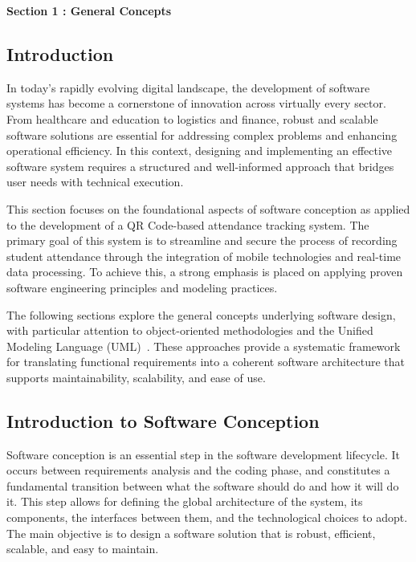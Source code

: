 \documentclass[12pt,a4paper]{report}
\begin{document}
\newpage
\vspace{0.3cm}

\begin{tcolorbox}[
    colback=mintgreen!20, 
    colframe=mintgreen!80!black, 
    width=\textwidth, 
    boxrule=1pt, 
    arc=5pt, 
    auto outer arc,
    left=10pt,
    right=10pt,
    top=6pt,
    bottom=6pt
]
    \centering
    \Large \textbf{Section 1 : General Concepts}
\end{tcolorbox}

{}

\subsection{Introduction}
In today's rapidly evolving digital landscape, the development of software systems has become a cornerstone of innovation across virtually every sector. From healthcare and education to logistics and finance, robust and scalable software solutions are essential for addressing complex problems and enhancing operational efficiency. In this context, designing and implementing an effective software system requires a structured and well-informed approach that bridges user needs with technical execution.

This section focuses on the foundational aspects of software conception as applied to the development of a QR Code-based attendance tracking system. The primary goal of this system is to streamline and secure the process of recording student attendance through the integration of mobile technologies and real-time data processing. To achieve this, a strong emphasis is placed on applying proven software engineering principles and modeling practices.

The following sections explore the general concepts underlying software design, with particular attention to object-oriented methodologies and the Unified Modeling Language (UML)~\cite{omg2017}. These approaches provide a systematic framework for translating functional requirements into a coherent software architecture that supports maintainability, scalability, and ease of use.


\subsection{Introduction to Software Conception}
Software conception is an essential step in the software development lifecycle. It occurs between requirements analysis and the coding phase, and constitutes a fundamental transition between what the software should do and how it will do it. This step allows for defining the global architecture of the system, its components, the interfaces between them, and the technological choices to adopt. The main objective is to design a software solution that is robust, efficient, scalable, and easy to maintain.
\end{document}
